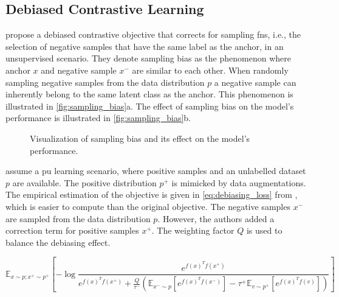 \subsection{Debiased Contrastive Learning}\label{subsec:debiasing_cl}

\citet{chuang_debiased_2020} propose a debiased contrastive objective that corrects for sampling \acp{fn}, 
i.e., the selection of negative samples that have the same label as the anchor, in an unsupervised scenario.
They denote sampling bias as the phenomenon where anchor $x$ and negative sample $x^-$ are similar to each other.
When randomly sampling negative samples from the data distribution $p$ 
a negative sample can inherently belong to the same latent class as the anchor.
This phenomenon is illustrated in \autoref{fig:sampling_bias}a.
The effect of sampling bias on the model's performance is illustrated in \autoref{fig:sampling_bias}b.

\begin{figure}%
    \centering
    \qquad
    \caption{Visualization of sampling bias and its effect on the model's performance.}%
    \label{fig:sampling_bias}%
\end{figure}

\citeauthor{chuang_debiased_2020} assume a \ac{pu} learning scenario, 
where positive samples and an unlabelled dataset $p$ are available.
The positive distribution $p^+$ is mimicked by data augmentations.
The empirical estimation of the objective is given in 
\autoref{eq:debiasing_loss} from \citet{chuang_debiased_2020},
which is easier to compute than the original objective.
The negative samples $x^-$ are sampled from the data distribution $p$.
However, the authors added a correction term for positive samples $x^+$.
The weighting factor $Q$ is used to balance the debiasing effect.

\begin{equation}
    \mathbb{E}_{x \sim p; x^+ \sim p^+}[{-\log{\frac{e^{f(x)^Tf(x^+)}}{e^{f(x)^Tf(x^+)}+ \frac{Q}{\tau^-}(\mathbb{E}_{x^- \sim p}[e^{f(x)^Tf(x^-)}]-\tau^+\mathbb{E}_{v \sim p^+}[e^{f(x)^Tf(v)}])}}}]
    \label{eq:debiasing_loss}
\end{equation}
